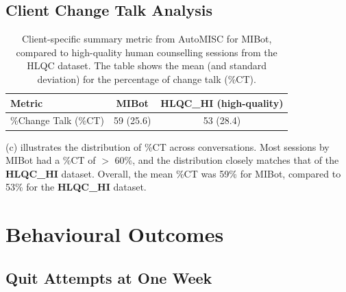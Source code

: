 \subsection{Client Change Talk Analysis}



\begin{table}[ht]
	\centering
	\small
	\setlength{\tabcolsep}{4pt}
	\renewcommand{\arraystretch}{1.1}
	\begin{tabular}{@{}lcc@{}}
		\toprule
		\textbf{Metric}      & \textbf{MIBot} & \textbf{HLQC\_HI (high-quality)} \\
		\midrule
		\%Change Talk (\%CT) & 59 (25.6)      & 53 (28.4)                       \\
		\bottomrule
	\end{tabular}
	\caption[AutoMISC Client Metrics for MIBot vs. Human]{Client-specific summary metric from AutoMISC for MIBot, compared to high-quality human counselling sessions from the HLQC dataset. The table shows the mean (and standard deviation) for the percentage of change talk (\%CT).}
	\label{table:automisc_summary_client}
\end{table}


(c) illustrates the distribution of \%CT across conversations. Most sessions by MIBot had a \%CT of $>$ 60\%, and the distribution closely matches that of the \textbf{HLQC\_HI} dataset. Overall, the mean \%CT was 59\% for MIBot, compared to 53\% for the \textbf{HLQC\_HI} dataset.

\section{Behavioural Outcomes}


\label{sec:behavioural-outcomes}

\subsection*{Quit Attempts at One Week}

